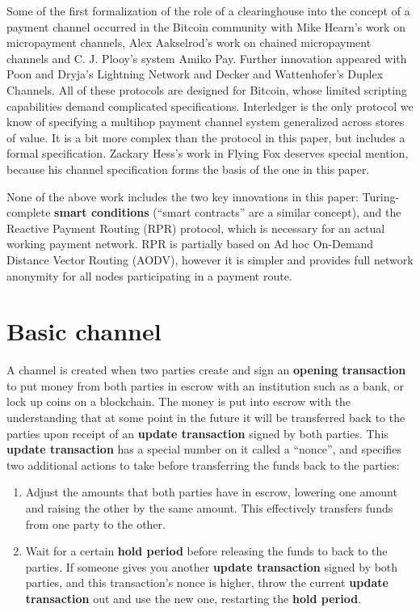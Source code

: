 \documentclass[a4paper]{article}
\newcommand{\bgls}[1]{\textbf{\gls{#1}}}
\newcommand{\bglspl}[1]{\textbf{\glspl{#1}}}
\begin{document}
Some of the first formalization of the role of a clearinghouse into the concept of a payment channel occurred in the Bitcoin community with Mike Hearn's work on micropayment channels\cite{btcwiki}\cite{bitcoinj}, Alex Aakselrod's work on chained micropayment channels\cite{blueadept} and C. J. Plooy's system Amiko Pay\cite{amiko}. Further innovation appeared with Poon and Dryja's Lightning Network\cite{lightning} and Decker and Wattenhofer's Duplex Channels\cite{duplexchannels}. All of these protocols are designed for Bitcoin, whose limited scripting capabilities demand complicated specifications. Interledger\cite{interledger} is the only protocol we know of specifying a multihop payment channel system generalized across stores of value. It is a bit more complex than the protocol in this paper, but includes a formal specification. Zackary Hess's work in Flying Fox\cite{flyingfox} deserves special mention, because his channel specification forms the basis of the one in this paper.

None of the above work includes the two key innovations in this paper: Turing-complete \bglspl{smart condition} (``smart contracts'' are a similar concept), and the Reactive Payment Routing (RPR) protocol, which is necessary for an actual working payment network. RPR is partially based on Ad hoc On-Demand Distance Vector Routing (AODV)\cite{aodv}, however it is simpler and provides full network anonymity for all nodes participating in a payment route.

\section{Basic channel}

A channel is created when two parties create and sign an \bgls{opening transaction} to put money from both parties in escrow with an institution such as a bank, or lock up coins on a blockchain. The money is put into escrow with the understanding that at some point in the future it will be transferred back to the parties upon receipt of an \bgls{update transaction} signed by both parties. This \bgls{update transaction} has a special number on it called a ``nonce'', and specifies two additional actions to take before transferring the funds back to the parties:

\begin{enumerate}
\item Adjust the amounts that both parties have in escrow, lowering one amount and raising the other by the same amount. This effectively transfers funds from one party to the other.
\item Wait for a certain \bgls{hold period} before releasing the funds to back to the parties. If someone gives you another \bgls{update transaction} signed by both parties, and this transaction's nonce is higher, throw the current \bgls{update transaction} out and use the new one, restarting the \bgls{hold period}.
\end{enumerate}
\end{document}
